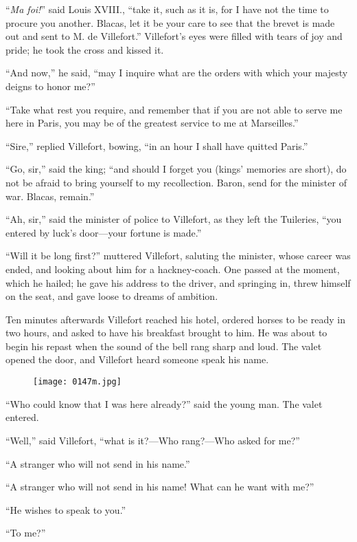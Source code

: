 “\textit{Ma foi!}” said Louis XVIII., “take it, such as it is, for I have not
the time to procure you another. Blacas, let it be your care to see
that the brevet is made out and sent to M. de Villefort.” Villefort’s
eyes were filled with tears of joy and pride; he took the cross and
kissed it.

“And now,” he said, “may I inquire what are the orders with which your
majesty deigns to honor me?”

“Take what rest you require, and remember that if you are not able to
serve me here in Paris, you may be of the greatest service to me at
Marseilles.”

“Sire,” replied Villefort, bowing, “in an hour I shall have quitted
Paris.”

“Go, sir,” said the king; “and should I forget you (kings’ memories are
short), do not be afraid to bring yourself to my recollection. Baron,
send for the minister of war. Blacas, remain.”

“Ah, sir,” said the minister of police to Villefort, as they left the
Tuileries, “you entered by luck’s door—your fortune is made.”

“Will it be long first?” muttered Villefort, saluting the minister,
whose career was ended, and looking about him for a hackney-coach. One
passed at the moment, which he hailed; he gave his address to the
driver, and springing in, threw himself on the seat, and gave loose to
dreams of ambition.

Ten minutes afterwards Villefort reached his hotel, ordered horses to
be ready in two hours, and asked to have his breakfast brought to him.
He was about to begin his repast when the sound of the bell rang sharp
and loud. The valet opened the door, and Villefort heard someone speak
his name.

\begin{figure}[h]
\texttt{[image: 0147m.jpg]}
\end{figure}

“Who could know that I was here already?” said the young man. The valet
entered.

“Well,” said Villefort, “what is it?—Who rang?—Who asked for me?”

“A stranger who will not send in his name.”

“A stranger who will not send in his name! What can he want with me?”

“He wishes to speak to you.”

“To me?”

